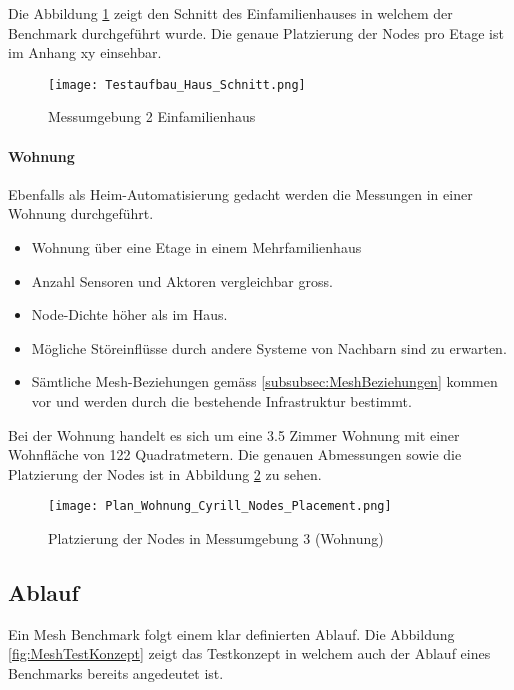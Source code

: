 Die Abbildung \ref{fig:Messumgebung2Einfamilienhaus} zeigt den Schnitt des Einfamilienhauses in welchem der Benchmark durchgeführt wurde. Die genaue Platzierung der Nodes pro Etage ist im Anhang xy einsehbar.

\begin{figure}[H]
	\centering
	\texttt{[image: Testaufbau\_Haus\_Schnitt.png]}
	\caption{Messumgebung 2 Einfamilienhaus}\label{fig:Messumgebung2Einfamilienhaus}
\end{figure}
	
\paragraph{Wohnung}
Ebenfalls als Heim-Automatisierung gedacht werden die Messungen in einer Wohnung durchgeführt.
\begin{itemize}
	\item Wohnung über eine Etage in einem Mehrfamilienhaus
	\item Anzahl Sensoren und Aktoren vergleichbar gross.
	\item Node-Dichte höher als im Haus.
	\item Mögliche Störeinflüsse durch andere Systeme von Nachbarn sind zu erwarten.
	\item Sämtliche Mesh-Beziehungen gemäss \ref{subsubsec:MeshBeziehungen} kommen vor und werden durch die bestehende Infrastruktur bestimmt.
\end{itemize}

Bei der Wohnung handelt es sich um eine 3.5 Zimmer Wohnung mit einer Wohnfläche von 122 Quadratmetern. Die genauen Abmessungen sowie die Platzierung der Nodes ist in Abbildung \ref{fig:PlatzierungderNodesinMessumgebung3} zu sehen.

\begin{figure}[H]
	\centering
	\texttt{[image: Plan\_Wohnung\_Cyrill\_Nodes\_Placement.png]}
	\caption{Platzierung der Nodes in Messumgebung 3 (Wohnung)}\label{fig:PlatzierungderNodesinMessumgebung3}
\end{figure}




\subsection{Ablauf}\label{subsec:AblaufMesh}

Ein Mesh Benchmark folgt einem klar definierten Ablauf. Die Abbildung \ref{fig:MeshTestKonzept} zeigt das Testkonzept in welchem auch der Ablauf eines Benchmarks bereits angedeutet ist.

